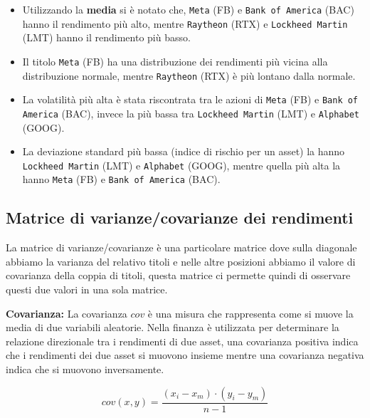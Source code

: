 \begin{itemize}
  \item Utilizzando la \textbf{media} si è notato che, \verb|Meta| (FB) e \verb|Bank of America| (BAC) hanno il rendimento più alto,
  mentre \verb|Raytheon| (RTX) e \verb|Lockheed Martin| (LMT) hanno il rendimento più basso.
  \item Il titolo \verb|Meta| (FB) ha una distribuzione dei rendimenti più vicina alla distribuzione normale, mentre 
  \verb|Raytheon| (RTX) è più lontano dalla normale.
  \item La volatilità più alta è stata riscontrata tra le azioni di \verb|Meta| (FB) e \verb|Bank of America| (BAC), invece
  la più bassa tra \verb|Lockheed Martin| (LMT) e \verb|Alphabet| (GOOG).
  \item La deviazione standard più bassa (indice di rischio per un asset) la hanno \verb|Lockheed Martin| (LMT) e \verb|Alphabet| (GOOG), mentre
  quella più alta la hanno \verb|Meta| (FB) e \verb|Bank of America| (BAC).
\end{itemize}

\pagebreak


\subsection{Matrice di varianze/covarianze dei rendimenti}

La matrice di varianze/covarianze è una particolare matrice dove sulla diagonale abbiamo la varianza del relativo titoli e nelle altre posizioni abbiamo il valore di covarianza
della coppia di titoli, questa matrice ci permette quindi di osservare questi due valori in una sola matrice.

\textbf{Covarianza:} La covarianza \(cov\) è una misura che rappresenta come si muove la media di due variabili aleatorie. Nella finanza è utilizzata per determinare la relazione direzionale
tra i rendimenti di due asset, una covarianza positiva indica che i rendimenti dei due asset si muovono insieme mentre una covarianza negativa indica che si muovono inversamente.

\begin{displaymath}
  cov(x,y) = \frac{(x_i - x_m) \cdot (y_i - y_m)}{n - 1}
\end{displaymath}

